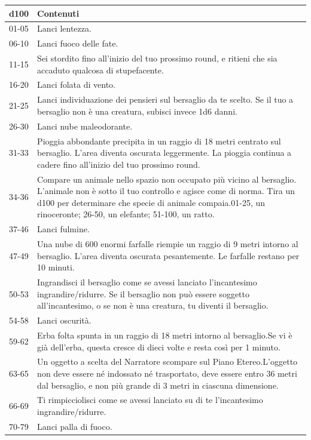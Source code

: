 \medskip

\begin{tabularx}{0.95\textwidth}{lX}
	\textbf{d100}& \textbf{Contenuti}\\
	\hline
	01-05 &Lanci lentezza.\\
	06-10 &Lanci fuoco delle fate.\\
	11-15 &Sei stordito fino all'inizio del tuo prossimo round, e ritieni che sia accaduto qualcosa di stupefacente.\\
	16-20 &Lanci folata di vento.\\
	21-25 &Lanci individuazione dei pensieri sul bersaglio da te scelto. Se il tuo a bersaglio non è una creatura, subisci invece 1d6 danni.\\
	26-30 &Lanci nube maleodorante.\\
	31-33 &Pioggia abbondante precipita in un raggio di 18 metri centrato sul bersaglio. L'area diventa oscurata leggermente. La pioggia continua a cadere fino all'inizio del tuo prossimo round.\\
	34-36 &Compare un animale nello spazio non occupato più vicino al bersaglio. L'animale non è sotto il tuo controllo e agisce come di norma. Tira un d100 per determinare che specie di animale compaia.01-25, un rinoceronte; 26-50, un elefante; 51-100, un ratto.\\
	37-46 &Lanci fulmine.\\
	47-49 &Una nube di 600 enormi farfalle riempie un raggio di 9 metri intorno al bersaglio. L'area diventa oscurata pesantemente. Le farfalle restano per 10 minuti.\\
	50-53 &Ingrandisci il bersaglio come se avessi lanciato l'incantesimo ingrandire/ridurre. Se il bersaglio non può essere soggetto all'incantesimo, o se non è una creatura, tu diventi il bersaglio.\\
	54-58 &Lanci oscurità.\\
	59-62 &Erba folta spunta in un raggio di 18 metri intorno al bersaglio.Se vi è già dell'erba, questa cresce di dieci volte e resta così per 1 minuto.\\
	63-65 &Un oggetto a scelta del Narratore scompare sul Piano Etereo.L'oggetto non deve essere né indossato né trasportato, deve essere entro 36 metri dal bersaglio, e non più grande di 3 metri in ciascuna dimensione.\\
	66-69 &Ti rimpicciolisci come se avessi lanciato su di te l'incantesimo ingrandire/ridurre.\\
	70-79 &Lanci palla di fuoco.\\

\end{tabularx}
